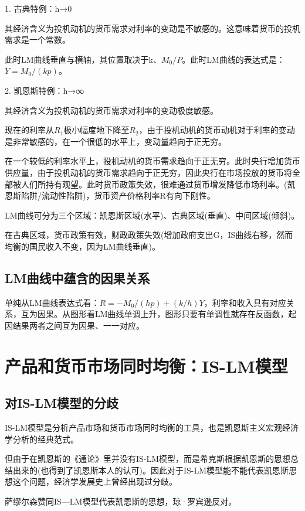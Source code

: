 \documentclass{article}
\begin{document}
\hspace*{\fill}

1. 古典特例：h→0

其经济含义为投机动机的货币需求对利率的变动是不敏感的。这意味着货币的投机需求是一个常数。

此时LM曲线垂直与横轴，其位置取决于k、$ M_0/P $。此时LM曲线的表达式是：$ Y=M_0/(kp) $。

2. 凯恩斯特例：h→∞

其经济含义为投机动机的货币需求对利率的变动极度敏感。

现在的利率从$ R_1 $极小幅度地下降至$ R_2 $，由于投机动机的货币动机对于利率的变动是非常敏感的，在一个很低的水平上，变动量趋向于正无穷。

在一个较低的利率水平上，投机动机的货币需求趋向于正无穷。此时央行增加货币供应量，由于投机动机的货币需求趋向于正无穷，因此央行在市场投放的货币将全部被人们所持有观望。此时货币政策失效，很难通过货币增发降低市场利率。(凯恩斯陷阱/流动性陷阱)，货币资产价格利率R有向下刚性。

\hspace*{\fill}

LM曲线可分为三个区域：凯恩斯区域(水平)、古典区域(垂直)、中间区域(倾斜)。

在古典区域，货币政策有效，财政政策失效(增加政府支出G，IS曲线右移，然而均衡的国民收入不变，因为LM曲线垂直)。

\subsection{LM曲线中蕴含的因果关系}
单纯从LM曲线表达式看：$ R=-M_0/(hp)+(k/h)Y $，利率和收入具有对应关系，互为因果。从图形看LM曲线单调上升，图形只要有单调性就存在反函数，起因结果两者之间互为因果、一一对应。


\section{产品和货币市场同时均衡：IS-LM模型}
\subsection{对IS-LM模型的分歧}
IS-LM模型是分析产品市场和货币市场同时均衡的工具，也是凯恩斯主义宏观经济学分析的经典范式。

但由于在凯恩斯的《通论》里并没有IS-LM模型，而是希克斯根据凯恩斯的思想总结出来的(也得到了凯恩斯本人的认可)。因此对于IS-LM模型能不能代表凯恩斯思想这个问题，经济学发展史上曾经出现过分歧。

萨缪尔森赞同IS—LM模型代表凯恩斯的思想，琼·罗宾逊反对。
\end{document}
